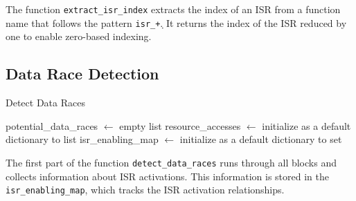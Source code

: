 \documentclass[
fancyheadings, %
%
%
]{stsreprt}
\begin{document}
{		The function \texttt{extract\_isr\_index} extracts the index of an ISR from a function name that follows the pattern \texttt{isr\_\d+}. It returns the index of the ISR reduced by one to enable zero-based indexing.
		
		\subsection*{Data Race Detection}
		
		\begin{algorithm}[H]
			\caption{Detect Data Races}
			\DontPrintSemicolon
			\SetAlgoLined
			\BlankLine
			potential\_data\_races $\gets$ empty list\;
			resource\_accesses $\gets$ initialize as a default dictionary to list\;
			isr\_enabling\_map $\gets$ initialize as a default dictionary to set\;
			\BlankLine
		\end{algorithm}
		
		
		The first part of the function \texttt{detect\_data\_races} runs through all blocks and collects information about ISR activations. This information is stored in the \texttt{isr\_enabling\_map}, which tracks the ISR activation relationships.
		
}
\end{document}
